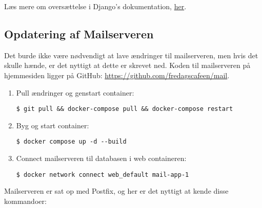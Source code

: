 Læs mere om oversættelse i Django's dokumentation, 
\href{https://docs.djangoproject.com/en/5.1/topics/i18n/translation/}{her}.

\subsection{Opdatering af Mailserveren}
\label{sec:mailserver}

Det burde ikke være nødvendigt at lave ændringer til mailserveren, 
men hvis det skulle hænde, er det nyttigt at dette er skrevet ned.
Koden til mailserveren på hjemmesiden ligger på GitHub: \url{https://github.com/fredagscafeen/mail}.

\begin{enumerate} \color{gray}
    \item Pull ændringer og genstart container:
    \begin{verbatim}
$ git pull && docker-compose pull && docker-compose restart\end{verbatim}
    \item Byg og start container:
    \begin{verbatim}
$ docker compose up -d --build\end{verbatim} \color{black}
    \item Connect mailserveren til databasen i web containeren:
    \begin{verbatim}
$ docker network connect web_default mail-app-1 \end{verbatim}
\end{enumerate}

Mailserveren er sat op med Postfix, og her er det nyttigt at kende disse kommandoer:

